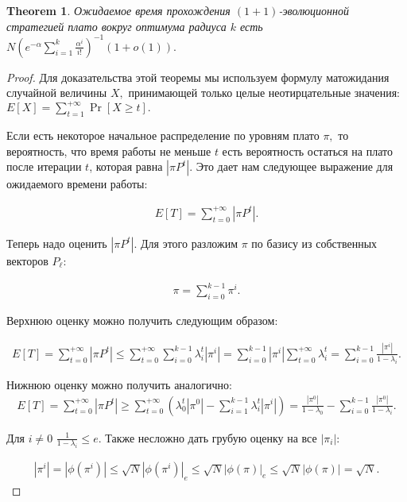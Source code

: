 \documentclass[russian]{article}
\newcommand{\OPO}{$(1 + 1)$}
\newtheorem{theorem}{Theorem}
\begin{document}
\begin{theorem}
  Ожидаемое время прохождения \OPO-эволюционной стратегией плато вокруг оптимума радиуса $k$ есть $N \left( e^{-\alpha} \sum\limits_{i = 1}^k \frac{\alpha^i}{i!}\right)^{-1} (1 + o(1)).$
\end{theorem}

\begin{proof}
  Для доказательства этой теоремы мы используем формулу матожидания случайной величины $X,$ принимающей только целые неотирцательные значения: $E[X] = \sum\limits_{t = 1}^{+\infty} \Pr[X \ge t].$

  Если есть некоторое начальное распределение по уровням плато $\pi,$ то вероятность, что время работы не меньше $t$ есть вероятность остаться на плато после итерации $t$, которая равна $|\pi P^t|.$ Это дает нам следующее выражение для ожидаемого времени работы:

\begin{align*}
  E[T] = \sum\limits_{t = 0}^{+\infty} |\pi P^t|.
\end{align*}

Теперь надо оценить $|\pi P^t|.$ Для этого разложим $\pi$ по базису из собственных векторов $P_\ell:$

\begin{align*}
  \pi = \sum\limits_{i = 0}^{k - 1} \pi^i.
\end{align*}

Верхнюю оценку можно получить следующим образом:

\begin{align*}
  E[T] = \sum\limits_{t = 0}^{+\infty}|\pi P^t| \le \sum\limits_{t = 0}^{+\infty} \sum\limits_{i = 0}^{k - 1} \lambda_i^t |\pi^i| = \sum\limits_{i = 0}^{k - 1} |\pi^i| \sum\limits_{t = 0}^{+\infty} \lambda_i^t = \sum\limits_{i = 0}^{k - 1} \frac{|\pi^i|}{1 - \lambda_i}.
\end{align*}

Нижнюю оценку можно получить аналогично:
\begin{align*}
  E[T] = \sum\limits_{t = 0}^{+\infty}|\pi P^t| \ge \sum\limits_{t = 0}^{+\infty} \left(\lambda_0^t |\pi^0| - \sum\limits_{i = 1}^{k - 1} \lambda_i^t |\pi^i|\right) = \frac{|\pi^0|}{1 - \lambda_0} - \sum\limits_{i = 0}^{k - 1} \frac{|\pi^0|}{1 - \lambda_i}.
\end{align*}


Для $i \ne 0$ $\frac{1}{1 - \lambda_i} \le e.$ Также несложно дать грубую оценку на все $|\pi_i|:$

\begin{align*}
|\pi^i| = |\phi(\pi^i)| \le \sqrt{N}|\phi(\pi^i)|_e \le \sqrt{N}|\phi(\pi)|_e \le \sqrt{N}|\phi(\pi)| = \sqrt{N}.
\end{align*}


\end{proof}
\end{document}
